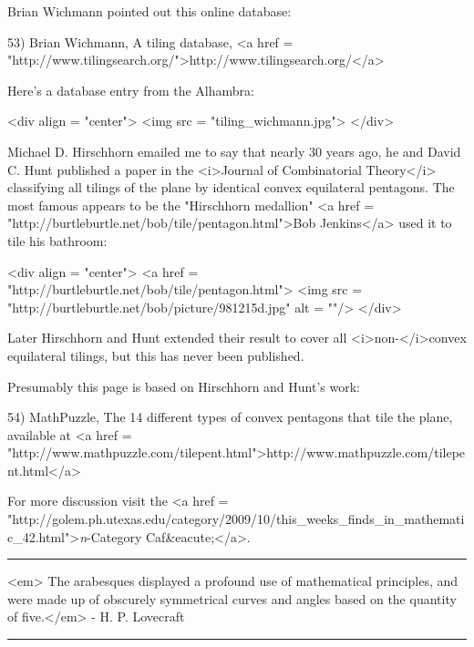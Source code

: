 Brian Wichmann pointed out this online database:

53) Brian Wichmann, A tiling database, 
<a href = "http://www.tilingsearch.org/">http://www.tilingsearch.org/</a>

Here's a database entry from the Alhambra:

<div align = "center">
<img src = "tiling_wichmann.jpg">
</div>

Michael D. Hirschhorn emailed me to say that nearly 30 years ago, he
and David C. Hunt published a paper in the <i>Journal of Combinatorial
Theory</i> classifying all tilings of the plane by identical convex
equilateral pentagons.  The most famous appears to be the "Hirschhorn
medallion"  <a href =
"http://burtleburtle.net/bob/tile/pentagon.html">Bob Jenkins</a> used
it to tile his bathroom:

<div align = "center">
<a href = "http://burtleburtle.net/bob/tile/pentagon.html">
<img src = "http://burtleburtle.net/bob/picture/981215d.jpg" alt = ""/>
</div>

Later Hirschhorn and Hunt extended their result to cover all
<i>non-</i>convex equilateral tilings, but this has never been
published.

Presumably this page is based on Hirschhorn and Hunt's work:

54) MathPuzzle, The 14 different types of convex pentagons that tile
the plane, available at <a href =
"http://www.mathpuzzle.com/tilepent.html">http://www.mathpuzzle.com/tilepent.html</a>

For more discussion visit the <a href =
"http://golem.ph.utexas.edu/category/2009/10/this_weeks_finds_in_mathematic_42.html">\emph{n}-Category
Caf&eacute;</a>.

\par\noindent\rule{\textwidth}{0.4pt}

<em>
The arabesques displayed a profound use of mathematical principles, and were made up
of obscurely symmetrical curves and angles based on the quantity of five.</em> -
H. P. Lovecraft


\par\noindent\rule{\textwidth}{0.4pt}

